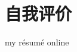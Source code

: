\documentclass[12pt,a4paper]{moderncv}
\begin{document}
\section{自我评价}

\begin{flushright}
\tiny{my r\'esum\'e online}\\
\end{flushright}
\end{document}
